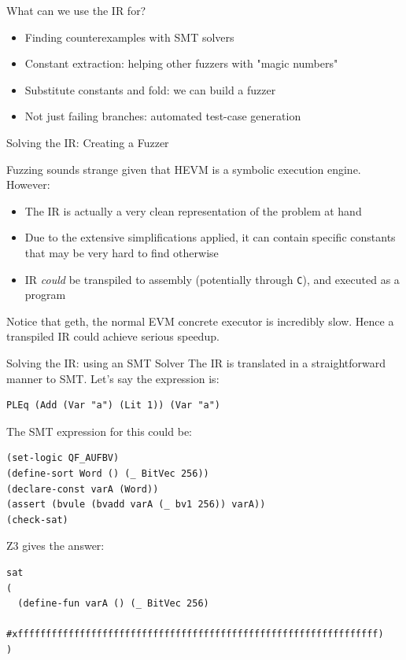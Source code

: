 \documentclass[aspectratio=169]{beamer}
\begin{document}
\begin{frame}[fragile=singleslide]{What can we use the IR for?}
\begin{itemize}
\item Finding counterexamples with SMT solvers
\item Constant extraction: helping other fuzzers with "magic numbers"
\item Substitute constants and fold: we can build a fuzzer
\item Not just failing branches: automated test-case generation
\end{itemize}

\end{frame}

\begin{frame}[fragile=singleslide]{Solving the IR: Creating a Fuzzer}

Fuzzing sounds strange given that HEVM is a symbolic execution engine. However:
\begin{itemize}
\item The IR is actually a very clean representation of the problem at hand
\item Due to the extensive simplifications applied, it can contain specific constants that may be very hard to find otherwise
\item IR \emph{could} be transpiled to assembly (potentially through \texttt{C}), and executed as a program
\end{itemize}
\bigskip

Notice that geth, the normal EVM concrete executor is incredibly slow. Hence a transpiled IR could achieve serious speedup.

\end{frame}

\begin{frame}[fragile=singleslide]{Solving the IR: using an SMT Solver}
The IR is translated in a straightforward manner to SMT. Let's say the expression is:

\begin{Verbatim}[frame=single, framerule=0.2mm, framesep=2mm,fontsize=\footnotesize]
PLEq (Add (Var "a") (Lit 1)) (Var "a")
\end{Verbatim}
\bigskip

The SMT expression for this could be:

\begin{Verbatim}[frame=single, framerule=0.2mm, framesep=2mm,fontsize=\footnotesize]
(set-logic QF_AUFBV)
(define-sort Word () (_ BitVec 256))
(declare-const varA (Word))
(assert (bvule (bvadd varA (_ bv1 256)) varA))
(check-sat)
\end{Verbatim}

Z3 gives the answer:

\begin{Verbatim}[frame=single, framerule=0.2mm, framesep=2mm,fontsize=\footnotesize]
sat
(
  (define-fun varA () (_ BitVec 256)
    #xffffffffffffffffffffffffffffffffffffffffffffffffffffffffffffffff)
)
\end{Verbatim}
\end{frame}
\end{document}
